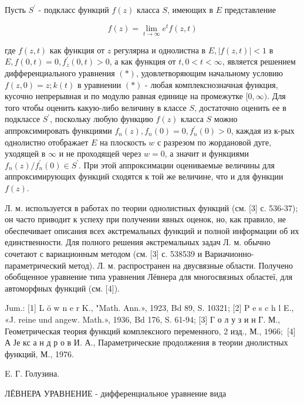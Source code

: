 \documentclass[10pt]{article}
\begin{document}
Пусть $S^{\prime}$ - подкласс функций $f(z)$ класса $S$, имеющих в $E$ представление



\[

f(z)=\lim _{t \rightarrow \infty} e^{t} f(z, t)

\]



где $f(z, t)$ как функция от $z$ регулярна и однолистна в $E,|f(z, t)|<1$ в $E, f(0, t)=0, f_{z}^{\prime}(0, t)>0$, а как функция от $t, 0<t<\infty$, является решением дифференциального уравнения $(*)$, удовлетворяющим начальному условию $f(z, 0)=z ; k(t)$ в уравнении $(*)$ - любая комплекснозначная функция, кусочно непрерывная и по модулю равная единице на промежутке $[0, \infty)$. Для того чтобы оценить какую-либо величину в классе $S$, достаточно оценить ее в подклассе $S^{\prime}$, поскольку любую функцию $f(z)$ класса $S$ можно аппроксимировать функциями $f_{n}(z), f_{n}(0)=0, f_{n}^{\prime}(0)>0$, каждая из к-рых однолистно отображает $E$ на плоскость $w$ с разрезом по жордановой дуге, уходящей в $\infty$ и не проходящей через $w=0$, а значит и функциями $f_{n}(z) / f_{n}^{\prime}(0) \in S^{\prime}$. При этой аппроксимации оцениваемые величины для аппроксимирующих функций сходятся к той же величине, что и для функции $f(z)$.



Л. м. используется в работах по теории однолистных функций (см. [3] с. 536-37); он часто приводит к успеху при получении явных оценок, но, как правило, не обеспечивает описания всех әкстремальных функций и полной информации об их единственности. Для полного решения әкстремальных задач Л. м. обычно сочетают с вариационным методом (см. [3] с. 538539 и Вариачионно-параметрический метод). Л. м. распространен на двусвязные области. Получено обобщенное уравнение типа уравнения Лёвнера для многосвязных областеї, для автоморфных функций (см. [4]).



Jum.: [1] L ö w n e r K., "Math. Ann.», 1923, Bd 89, S. 10321; [2] P e s c h l E., «J. reine und angew. Math.», 1936, Bd 176, S. 61-94; [3] Г о л у з и н Г. М., Геометрическая теория функций комплексного переменного, 2 изд., М., $1966 ;$ [4] А Је кс а н д р о в И. А., Параметрические продолжения в теории днолистных функций, М., 1976.



E. Г. Голузина.



ЛЁВНЕРА УРАВНЕНИЕ - дифференциальное уравнение вида
\end{document}
